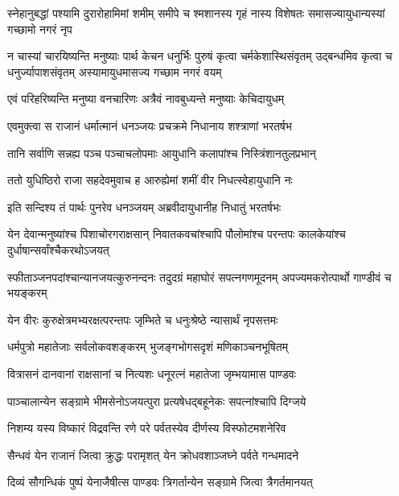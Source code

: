 \onelineshloka
{स्नेहानुबद्धां पश्यामि दुरारोहामिमां शमीम्}
\twolineshloka
{समीपे च श्मशानस्य गृहं नास्य विशेषतः}
{समासज्यायुधान्यस्यां गच्छामो नगरं नृप}


\onelineshloka
{न चास्यां चारयिष्यन्ति मनुष्याः पार्थ केचन}
\threelineshloka
{धनुर्भिः पुरुषं कृत्वा चर्मकेशास्थिसंवृतम्}
{उद्बन्धमिव कृत्वा च धनुर्ज्यापाशसंवृतम्}
{अस्यामायुधमासज्य गच्छाम नगरं वयम्}


\twolineshloka
{एवं परिहरिष्यन्ति मनुष्या वनचारिणः}
{अत्रैवं नावबुध्यन्ते मनुष्याः केचिदायुधम्}



\twolineshloka
{एवमुक्त्वा स राजानं धर्मात्मानं धनञ्जयः}
{प्रचक्रमे निधानाय शश्त्राणां भरतर्षभ}


\twolineshloka
{तानि सर्वाणि सन्नह्य पञ्च पञ्चाचलोपमाः}
{आयुधानि कलापांश्च निस्त्रिंशानतुलप्रभान्}


\twolineshloka
{ततो युधिष्ठिरो राजा सहदेवमुवाच ह}
{आरुह्येमां शमीं वीर निधत्स्वेहायुधानि नः}


\twolineshloka
{इति सन्दिश्य तं पार्थः पुनरेव धनञ्जयम्}
{अब्रवीदायुधानीह निधातुं भरतर्षभः}



\threelineshloka
{येन देवान्मनुष्यांश्च पिशाचोरगराक्षसान्}
{निवातकवचांश्चापि पौलोमांश्च परन्तपः}
{कालकेयांश्च दुर्धाषान्सर्वांश्चैकरथोऽजयत्}


\threelineshloka
{स्फीताञ्जनपदांश्चान्यानजयत्कुरुनन्दनः}
{तदुदग्रं महाघोरं सपत्नगणमूदनम्}
{अपज्यमकरोत्पार्थो गाण्डीवं च भयङ्करम्}


\twolineshloka
{येन वीरः कुरुक्षेत्रमभ्यरक्षत्परन्तपः}
{जृम्भिते च धनुःश्रेष्ठे न्यासार्थं नृपसत्तमः}


\twolineshloka
{धर्मपुत्रो महातेजाः सर्वलोकवशङ्करम्}
{भुजङ्गभोगसदृशं मणिकाञ्चनभूषितम्}


\twolineshloka
{वित्रासनं दानवानां राक्षसानां च नित्यशः}
{धनूरत्नं महातेजा जृम्भयामास पाण्डवः}


\twolineshloka
{पाञ्चालान्येन सङ्ग्रामे भीमसेनोऽजयत्पुरा}
{प्रत्यषेधद्बहूनेकः सपत्नांश्चापि दिग्जये}


\twolineshloka
{निशम्य यस्य विष्कारं विद्रवन्ति रणे परे}
{पर्वतस्येव दीर्णस्य विस्फोटमशनेरिव}


\twolineshloka
{सैन्धवं येन राजानं जित्वा क्रुद्धः परामृशत्}
{येन क्रोधवशाञ्जघ्ने पर्वते गन्धमादने}


\twolineshloka
{दिव्यं सौगन्धिकं पुष्पं येनाजैषीत्स पाण्डवः}
{त्रिगर्तान्येन सङ्ग्रामे जित्वा त्रैगर्तमानयत्}



